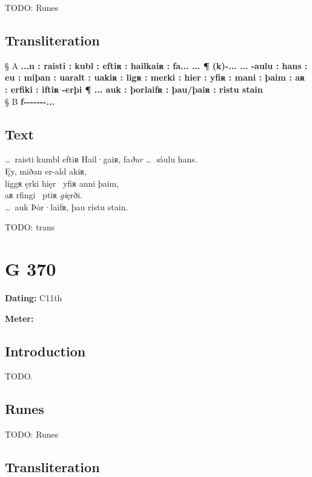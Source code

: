 TODO: Runes%

\subsection{Transliteration}

§ A \textbf{...n : raisti : kubl : eftiʀ : hailkaiʀ : fa... ... ¶ (k)-... ... -aulu : hans : eu : miþan : uaralt : uakiʀ : ligʀ : merki : hier : yfiʀ : mani : þaim : aʀ : erfiki : iftiʀ -erþi ¶ ... auk : þorlaifʀ : þau/þaiʀ : ristu stain} \\
§ B \textbf{f-{}-{}-{}-{}-{}-{}-...}

\subsection{Text}

\bpg\bpa[0]%
\dots\ raisti kumbl eftiʀ Hail·gaiʀ, fa\emph{ður} \dots\ \emph{s}áulu hans. \\
\ind Ęy, miðan er-ald akiʀ, \\
liggʀ ęrki hięr \hld\ yfiʀ anni þaim, \\
aʀ rfingi \hld\ ptiʀ \emph{gi}ęrði. \\
\dots\ auk Þȯr·laifʀ, þau rístu stain.\epa

\bpb TODO: trans\epb\epg

\sectionline\clearpage


\section{G 370}

\begin{flushright}%
\textbf{Dating:} C11th

\textbf{Meter:} \Fornyrdislag
\end{flushright}%

\subsection{Introduction}

TODO.

\subsection{Runes}

TODO: Runes%

\subsection{Transliteration}

